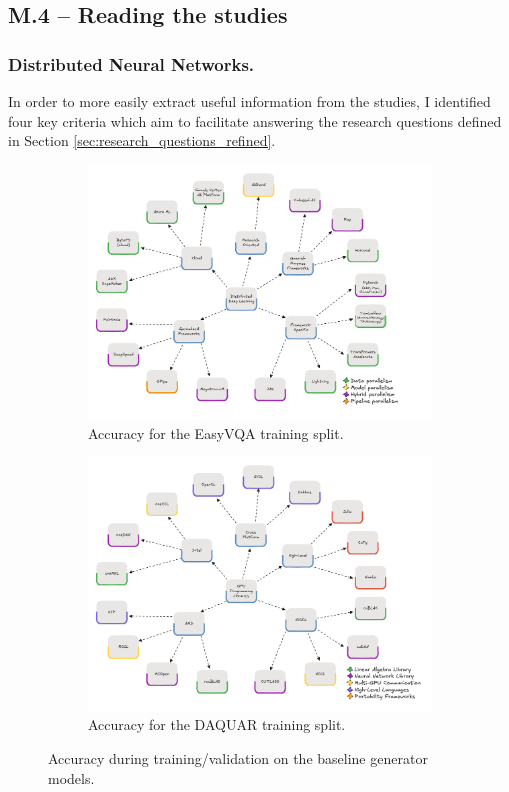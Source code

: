 \subsection{M.4 -- Reading the studies}
\label{sec:reading-studies}
\subsubsection{Distributed Neural Networks.}

In order to more easily extract useful information from the studies, I identified four key criteria
which aim to facilitate answering the research questions defined in Section
\ref{sec:research_questions_refined}.

\begin{figure}
	\centering
	\begin{subfigure}{0.48\linewidth}
		\includegraphics[width=\textwidth]{figures/mindmap}
		\caption{Accuracy for the EasyVQA training split.}
		\label{fig:base-a}
	\end{subfigure}
	\hfill
	\begin{subfigure}{0.48\linewidth}
		\includegraphics[width=\textwidth]{figures/mindmap-cuda}
		\caption{Accuracy for the DAQUAR training split.}
		\label{fig:base-b}
	\end{subfigure}
	\caption{Accuracy during training/validation on the baseline generator models.}
	\label{fig:base}
\end{figure}

